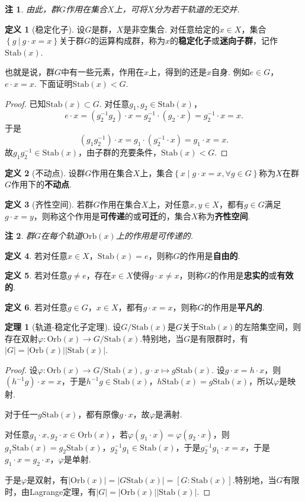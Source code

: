 \documentclass[12pt]{ctexart}
\theoremstyle{definition}
\newtheorem{definition}{定义}[section]
\newtheorem{theorem}{定理}[section]
\theoremstyle{plain}
\newtheorem*{remark}{注}
\newcommand{\Orb}{\mathrm{Orb}}
\newcommand{\Stab}{\mathrm{Stab}}
\begin{document}
\begin{remark}
	由此，群$G$作用在集合$X$上，可将$X$分为若干轨道的无交并.
\end{remark}
\begin{definition}[稳定化子]
	设$G$是群，$X$是非空集合. 对任意给定的$x\in X$，集合$\left\{g\ |\ g\cdot x=x\right\}$关于群$G$的运算构成群，称为$x$的\textbf{稳定化子}或\textbf{迷向子群}，记作$\Stab(x)$.
\end{definition}
也就是说，群$G$中有一些元素，作用在$x$上，得到的还是$x$自身. 例如$e\in G$，$e\cdot x=x$. 下面证明$\Stab(x)<G$.
\begin{proof}
	已知$\Stab(x)\subset G$. 对任意$g_1,g_2\in \Stab(x)$，
	$$e\cdot x=(g_2^{-1}g_2)\cdot x=g_2^{-1}\cdot(g_2\cdot x)=g_2^{-1}\cdot x=x.$$
	于是
	$$(g_1g_2^{-1})\cdot x=g_1\cdot (g_2^{-1}\cdot x)=g_1\cdot x=x.$$
	故$g_1g_2^{-1}\in \Stab(x)$，由子群的充要条件，$\Stab(x)<G$.
\end{proof}
\begin{definition}[不动点]
	设群$G$作用在集合$X$上，集合$\left\{x\mid g\cdot x=x,\forall g\in G\right\}$称为$X$在群$G$作用下的\textbf{不动点}.
\end{definition}
\begin{definition}[齐性空间]
	若群$G$作用在集合$X$上，对任意$x,y\in X$，都有$g\in G$满足$g\cdot x=y$，则称这个作用是\textbf{可传递}的或\textbf{可迁}的，集合$X$称为\textbf{齐性空间}.
\end{definition}
\begin{remark}
	群$G$在每个轨道$\Orb(x)$上的作用是可传递的.
\end{remark}
\begin{definition}
	若对任意$x\in X$，$\Stab(x)=e$，则称$G$的作用是\textbf{自由的}.
\end{definition}
\begin{definition}
	若对任意$g\neq e$，存在$x\in X$使得$g\cdot x\neq x$，则称$G$的作用是\textbf{忠实的}或\textbf{有效的}.
\end{definition}
\begin{definition}
	若对任意$g\in G$，$x\in X$，都有$g\cdot x=x$，则称$G$的作用是\textbf{平凡的}.
\end{definition}
\begin{theorem}[轨道-稳定化子定理]
	设$G/\Stab(x)$是$G$关于$\Stab(x)$的左陪集空间，则存在双射$\varphi:\Orb(x)\to G/\Stab(x)$.特别地，当$G$是有限群时，有$|G|=|\Orb(x)||\Stab(x)|$.
\end{theorem}
\begin{proof}
	设$\varphi:\Orb(x)\to G/\Stab(x),\ g\cdot x\mapsto g\Stab(x)$. 设$g\cdot x=h\cdot x$，则$(h^{-1}g)\cdot x=x$，于是$h^{-1}g\in\Stab(x)$，$h\Stab(x)=g\Stab(x)$，所以$\varphi$是映射.
	
	对于任一$g\Stab(x)$，都有原像$g\cdot x$，故$\varphi$是满射.
	
	对任意$g_1\cdot x,g_2\cdot x\in\Orb(x)$，若$\varphi(g_1\cdot x)=\varphi(g_2\cdot x)$，则$g_1\Stab(x)=g_2\Stab(x)$，$g_2^{-1}g_1\in\Stab(x)$，于是$g_2^{-1}g_1\cdot x=x$，于是$g_1\cdot x=g_2\cdot x$，$\varphi$是单射.
	
	于是$\varphi$是双射，有$|\Orb(x)|=|G\Stab(x)|=\left[G:\Stab(x)\right]$.特别地，当$G$有限时，由Lagrange定理，有$|G|=|\Orb(x)||\Stab(x)|$.
\end{proof}
\end{document}
